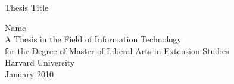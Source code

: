 
\thispagestyle{empty}
\begin{center}

  \vspace*{0.6in}
  Thesis Title

  \vspace{2.3in}
  Name\\
  \vspace{1.8in}
  A Thesis in the Field of Information Technology\\
  for the Degree of Master of Liberal Arts in Extension Studies\\
  \vspace{.8in}
  Harvard University\\

  \vfill
  January 2010
  \vspace*{.5in}
\end{center}




